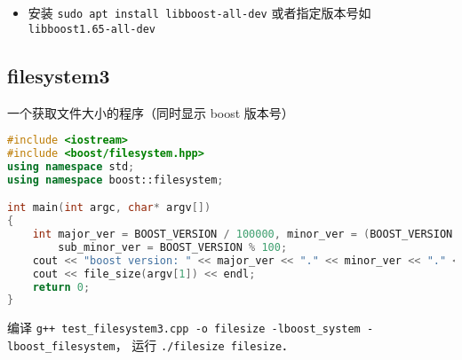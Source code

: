 
\begin{itemize}
\item 安装 \verb|sudo apt install libboost-all-dev| 或者指定版本号如 \verb|libboost1.65-all-dev|
\end{itemize}

\subsection{filesystem3}
一个获取文件大小的程序（同时显示 boost 版本号）
\begin{lstlisting}[language=cpp, caption=test_filesystem3.cpp]
#include <iostream>
#include <boost/filesystem.hpp>
using namespace std;
using namespace boost::filesystem;

int main(int argc, char* argv[])
{
	int major_ver = BOOST_VERSION / 100000, minor_ver = (BOOST_VERSION / 100) % 1000,
		sub_minor_ver = BOOST_VERSION % 100;
	cout << "boost version: " << major_ver << "." << minor_ver << "." << sub_minor_ver << endl;
	cout << file_size(argv[1]) << endl;
	return 0;
}
\end{lstlisting}

编译 \verb|g++ test_filesystem3.cpp -o filesize -lboost_system -lboost_filesystem|， 运行 \verb|./filesize filesize|．
